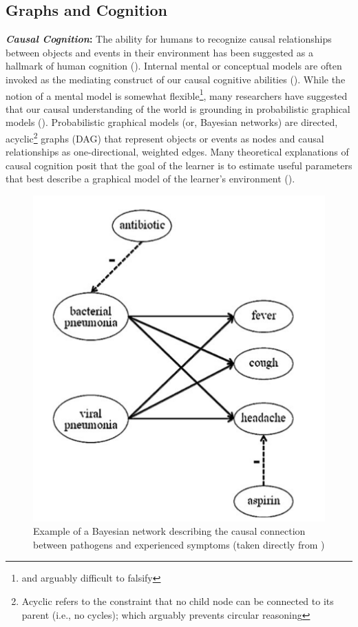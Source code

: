 \documentclass[12pt]{article}
\let\oldcite=\cite
\renewcommand{\cite}[1]{\textcolor[rgb]{0, .121, .388}{\oldcite{#1}}}
\begin{document}
\subsection{Graphs and Cognition}

\textbf{\emph{Causal Cognition}:} The ability for humans to recognize causal relationships between objects and events in their environment has been suggested as a hallmark of human cognition (\cite{penn2008darwin}). Internal mental or conceptual models are often invoked as the mediating construct of our causal cognitive abilities (\cite{murphy1985role,carey1985conceptual,springer1989development,barrett1993theory}). While the notion of a mental model is somewhat flexible\footnote{and arguably difficult to falsify}, many researchers have suggested that our causal understanding of the world is grounding in probabilistic graphical models (\cite{danks2014unifying,griffiths2010probabilistic,holyoak2011causal}). Probabilistic graphical models (or, Bayesian networks) are directed, acyclic\footnote{Acyclic refers to the constraint that no child node can be connected to its parent (i.e., no cycles); which arguably prevents circular reasoning} graphs (DAG) that represent objects or events as nodes and causal relationships as one-directional, weighted edges. Many theoretical explanations of causal cognition posit that the goal of the learner is to estimate useful parameters that best describe a graphical model of the learner's environment (\cite{danks2014unifying}). 

\begin{figure}[h]
    \centering
    \label{fig:bayesianNetwork}
    \includegraphics[scale=.4]{figures/bayesianNetwork.png}
    \caption{Example of a Bayesian network describing the causal connection between pathogens and experienced symptoms (taken directly from \cite{holyoak2011causal})}
\end{figure}
\end{document}
